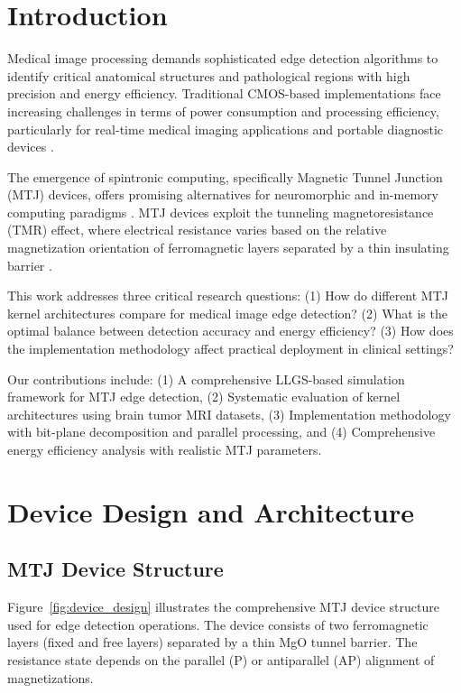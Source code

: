 \documentclass[conference]{IEEEtran}
\begin{document}
\section{Introduction}

Medical image processing demands sophisticated edge detection algorithms to identify critical anatomical structures and pathological regions with high precision and energy efficiency. Traditional CMOS-based implementations face increasing challenges in terms of power consumption and processing efficiency, particularly for real-time medical imaging applications and portable diagnostic devices \cite{b1}. 

The emergence of spintronic computing, specifically Magnetic Tunnel Junction (MTJ) devices, offers promising alternatives for neuromorphic and in-memory computing paradigms \cite{b2}. MTJ devices exploit the tunneling magnetoresistance (TMR) effect, where electrical resistance varies based on the relative magnetization orientation of ferromagnetic layers separated by a thin insulating barrier \cite{b3}.

This work addresses three critical research questions: (1) How do different MTJ kernel architectures compare for medical image edge detection? (2) What is the optimal balance between detection accuracy and energy efficiency? (3) How does the implementation methodology affect practical deployment in clinical settings?

Our contributions include: (1) A comprehensive LLGS-based simulation framework for MTJ edge detection, (2) Systematic evaluation of kernel architectures using brain tumor MRI datasets, (3) Implementation methodology with bit-plane decomposition and parallel processing, and (4) Comprehensive energy efficiency analysis with realistic MTJ parameters.

\section{Device Design and Architecture}

\subsection{MTJ Device Structure}

Figure~\ref{fig:device_design} illustrates the comprehensive MTJ device structure used for edge detection operations. The device consists of two ferromagnetic layers (fixed and free layers) separated by a thin MgO tunnel barrier. The resistance state depends on the parallel (P) or antiparallel (AP) alignment of magnetizations.
\end{document}
